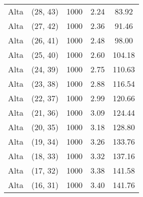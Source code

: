 \begin{tabular}{c c c c c}
Alta & (28, 43) &  1000 & 2.24 & 83.92 \\
Alta & (27, 42) &  1000 & 2.36 & 91.46 \\
Alta & (26, 41) &  1000 & 2.48 & 98.00 \\
Alta & (25, 40) &  1000 & 2.60 & 104.18 \\
Alta & (24, 39) &  1000 & 2.75 & 110.63 \\
Alta & (23, 38) &  1000 & 2.88 & 116.54 \\
Alta & (22, 37) &  1000 & 2.99 & 120.66 \\
Alta & (21, 36) &  1000 & 3.09 & 124.44 \\
Alta & (20, 35) &  1000 & 3.18 & 128.80 \\
Alta & (19, 34) &  1000 & 3.26 & 133.76 \\
Alta & (18, 33) &  1000 & 3.32 & 137.16 \\
Alta & (17, 32) &  1000 & 3.38 & 141.58 \\
Alta & (16, 31) &  1000 & 3.40 & 141.76 \\
\hline
\end{tabular}
